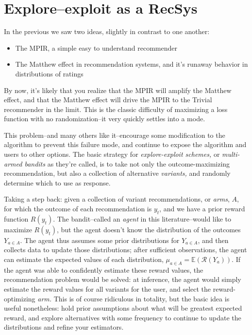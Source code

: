 \section{Explore–exploit as a RecSys}

In the previous we saw two ideas, slightly in contrast to one another:

\begin{itemize}
\item The MPIR, a simple easy to understand recommender
\item The Matthew effect in recommendation systems, and it's runaway behavior in distributions of ratings
\end{itemize}

By now, it's likely that you realize that the MPIR will amplify the Matthew effect, and that the Matthew effect will drive the MPIR to the Trivial recommender in the limit. This is the classic difficulty of maximizing a loss function with no randomization–it very quickly settles into a mode.

This problem–and many others like it–encourage some modification to the algorithm to prevent this failure mode, and continue to expose the algorithm and users to other options. The basic strategy for \emph{explore-exploit schemes,} or \emph{multi-armed bandits} as they're called, is to take not only the outcome-maximizing recommendation, but also a collection of alternative \emph{variants,} and randomly determine which to use as response. 

Taking a step back: given a collection of variant recommendations, or \emph{arms}, $A$, for which the outcome of each recommendation is $y_t$, and we have a prior reward function $R(y_t)$. The bandit–called an \emph{agent} in this literature–would like to maximize $R(y_t)$, but the agent doesn't know the distribution of the outcomes $Y_{a\in A}$. The agent thus assumes some prior distributions for $Y_{a\in A}$, and then collects data to update those distributions; after sufficient observations, the agent can estimate the expected values of each distribution, $\mu_{a\in A}=\mathbb{E}(\mathcal{R}(Y_a))$. If the agent was able to confidently estimate these reward values, the recommendation problem would be solved: at inference, the agent would simply estimate the reward values for all variants for the user, and select the reward-optimizing \emph{arm.} This is of course ridiculous in totality, but the basic idea is useful nonetheless: hold prior assumptions about what will be greatest expected reward, and explore alternatives with some frequency to continue to update the distributions and refine your estimators.

